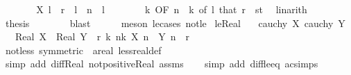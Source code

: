 \begin{isabellebody}
\ \ \ \ \isamarkupfalse%
\ \isamarkupfalse%
\ {\isachardoublequoteopen}X\ l\ {\isasymle}\ r{\isachardoublequoteclose}\ \ {\isachardoublequoteopen}l\ {\isasymge}\ n{\isachardoublequoteclose}\ \ l\isanewline
\ \ \ \ \ \ \isamarkupfalse%
\ k\ {\isacharbrackleft}{\kern0pt}OF\ {\isacartoucheopen}n\ {\isasymge}\ k{\isacartoucheclose}{\isacharcomma}{\kern0pt}\ of\ l{\isacharbrackright}{\kern0pt}\ that\ {\isacartoucheopen}r\ {\isacharequal}{\kern0pt}\ s{\isacharplus}{\kern0pt}t{\isacartoucheclose}\ \isamarkupfalse%
\ linarith\isanewline
\ \ \ \ \isamarkupfalse%
\ \isamarkupfalse%
\ {\isacharquery}{\kern0pt}thesis\isanewline
\ \ \ \ \ \ \isamarkupfalse%
\ blast\isanewline
\ \ \ \ \isamarkupfalse%
\isanewline
{}\isamarkupfalse%
\ {\isacharparenleft}{\kern0pt}meson\ le{\isacharunderscore}{\kern0pt}cases\ not{\isacharunderscore}{\kern0pt}le{\isacharparenright}{\kern0pt}%
\endisatagproof
{\isafoldproof}%
%
\isadelimproof
\isanewline
%
\endisadelimproof
\isanewline
{}\isamarkupfalse%
\ le{\isacharunderscore}{\kern0pt}Real{\isacharcolon}{\kern0pt}\isanewline
\ \ \ {\isachardoublequoteopen}cauchy\ X{\isachardoublequoteclose}\ {\isachardoublequoteopen}cauchy\ Y{\isachardoublequoteclose}\isanewline
\ \ \ {\isachardoublequoteopen}Real\ X\ {\isasymle}\ Real\ Y\ {\isacharequal}{\kern0pt}\ {\isacharparenleft}{\kern0pt}{\isasymforall}r{\isachargreater}{\kern0pt}{}{\isachardot}{\kern0pt}\ {\isasymexists}k{\isachardot}{\kern0pt}\ {\isasymforall}n{\isasymge}k{\isachardot}{\kern0pt}\ X\ n\ {\isasymle}\ Y\ n\ {\isacharplus}{\kern0pt}\ r{\isacharparenright}{\kern0pt}{\isachardoublequoteclose}\isanewline
%
\isadelimproof
\ \ %
\endisadelimproof
%
\isatagproof
{}\isamarkupfalse%
\ not{\isacharunderscore}{\kern0pt}less\ {\isacharbrackleft}{\kern0pt}symmetric{\isacharcomma}{\kern0pt}\ \ {\isacharprime}{\kern0pt}a{\isacharequal}{\kern0pt}real{\isacharbrackright}{\kern0pt}\ less{\isacharunderscore}{\kern0pt}real{\isacharunderscore}{\kern0pt}def\isanewline
\ \ \isamarkupfalse%
\ {\isacharparenleft}{\kern0pt}simp\ add{\isacharcolon}{\kern0pt}\ diff{\isacharunderscore}{\kern0pt}Real\ not{\isacharunderscore}{\kern0pt}positive{\isacharunderscore}{\kern0pt}Real\ assms{\isacharparenright}{\kern0pt}\isanewline
\ \ \isamarkupfalse%
\ {\isacharparenleft}{\kern0pt}simp\ add{\isacharcolon}{\kern0pt}\ diff{\isacharunderscore}{\kern0pt}le{\isacharunderscore}{\kern0pt}eq\ ac{\isacharunderscore}{\kern0pt}simps{\isacharparenright}{\kern0pt}\isanewline

\end{isabellebody}
